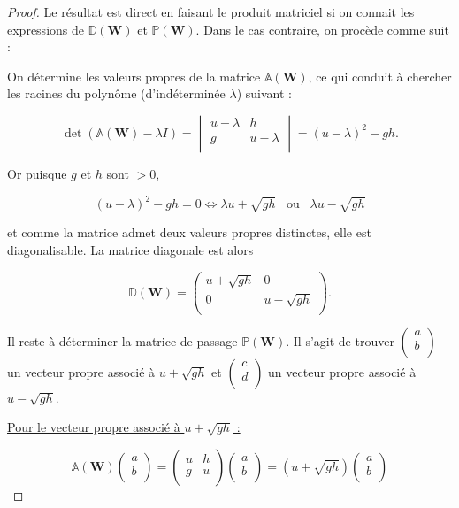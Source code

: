 \documentclass[
11pt, %
francais, %
singlespacing, %
headsepline, %
]{MastersDoctoralThesis} %
\begin{document}
\begin{proof} Le résultat est direct en faisant le produit matriciel si on connait les expressions de $\mathbb{D}(\textbf{W})$ et $\mathbb{P}(\textbf{W})$. Dans le cas contraire, on procède comme suit :


On détermine les valeurs propres de la matrice $\mathbb{A}(\textbf{W})$, ce qui conduit à chercher les racines du polynôme (d'indéterminée $\lambda$) suivant :

$$\det(\mathbb{A}(\textbf{W})-\lambda I) =\begin{vmatrix}
   u-\lambda & h  \\
   g & u-\lambda  \\
\end{vmatrix} = (u-\lambda)^{2}-gh.$$

Or puisque $g$ et $h$ sont $>0$,

$$(u-\lambda)^{2}-gh=0 \Leftrightarrow \lambda u +\sqrt{gh} \phantom{...}\text{ou}\phantom{...} \lambda u -\sqrt{gh}$$

et comme la matrice admet deux valeurs propres distinctes, elle est diagonalisable. La matrice diagonale est alors

$$\mathbb{D}(\textbf{W}) =\begin{pmatrix}
   u+\sqrt{gh} & 0  \\
   0 & u-\sqrt{gh}  \\
\end{pmatrix}.
$$

Il reste à déterminer la matrice de passage $\mathbb{P}(\textbf{W})$. Il s'agit de trouver 
$\begin{pmatrix}
   a\\
   b\\
\end{pmatrix}
$ un vecteur propre associé à $u +\sqrt{gh}$ et
$\begin{pmatrix}
   c\\
   d\\
\end{pmatrix}
$ un vecteur propre associé à $u -\sqrt{gh}$.

\underline{Pour le vecteur propre associé à $u +\sqrt{gh}$ :}


$$\mathbb{A}(\textbf{W}) \begin{pmatrix}
   a\\
   b\\
\end{pmatrix}=\begin{pmatrix}
   u & h  \\
   g & u  \\
\end{pmatrix} \begin{pmatrix}
   a\\
   b\\
\end{pmatrix}=(u+\sqrt{gh})\begin{pmatrix}
   a\\
   b\\
\end{pmatrix}$$



\end{proof}
\end{document}
